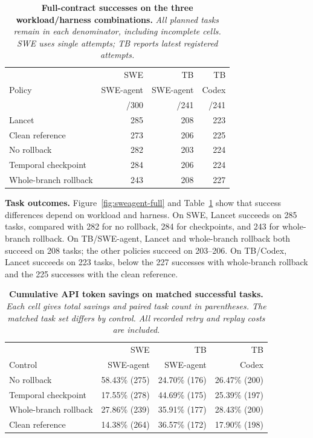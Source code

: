 \begin{table}[t]
\centering
\caption{\textbf{Full-contract successes on the three workload/harness combinations.}
\small\emph{All planned tasks remain in each denominator, including incomplete
cells. SWE uses single attempts; TB reports latest registered attempts.}}
\label{tab:swe-full-results}
\scriptsize
\setlength{\tabcolsep}{3pt}
\begin{tabular}{lrrr}
\toprule
 & SWE & TB & TB \\
Policy & SWE-agent & SWE-agent & Codex \\
 & /300 & /241 & /241 \\
\midrule
Lancet & 285 & 208 & 223 \\
Clean reference & 273 & 206 & 225 \\
No rollback & 282 & 203 & 224 \\
Temporal checkpoint & 284 & 206 & 224 \\
Whole-branch rollback & 243 & 208 & 227 \\
\bottomrule
\end{tabular}
\end{table}

\textbf{Task outcomes.}
Figure~\ref{fig:sweagent-full} and Table~\ref{tab:swe-full-results} show that
success differences depend on workload and harness.
On SWE, Lancet succeeds on 285 tasks, compared with 282 for no rollback,
284 for checkpoints, and 243 for whole-branch rollback.
On TB/SWE-agent, Lancet and whole-branch rollback both succeed on 208 tasks;
the other policies succeed on 203--206.
On TB/Codex, Lancet succeeds on 223 tasks, below the 227 successes with
whole-branch rollback and the 225 successes with the clean reference.

\begin{table}[t]
\centering
\caption{\textbf{Cumulative API token savings on matched successful tasks.}
\small\emph{Each cell gives total savings and paired task count in parentheses.
The matched task set differs by control.
All recorded retry and replay costs are included.}}
\label{tab:swe-paired-savings}
\scriptsize
\setlength{\tabcolsep}{3pt}
\begin{tabular}{lrrr}
\toprule
 & SWE & TB & TB \\
Control & SWE-agent & SWE-agent & Codex \\
\midrule
No rollback & 58.43\% (275) & 24.70\% (176) & 26.47\% (200) \\
Temporal checkpoint & 17.55\% (278) & 44.69\% (175) & 25.39\% (197) \\
Whole-branch rollback & 27.86\% (239) & 35.91\% (177) & 28.43\% (200) \\
Clean reference & 14.38\% (264) & 36.57\% (172) & 17.90\% (198) \\
\bottomrule
\end{tabular}
\end{table}

